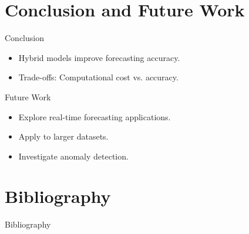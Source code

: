 \documentclass[10pt]{beamer}
\begin{document}
\section{Conclusion and Future Work}
\begin{frame}{Conclusion}
    \begin{itemize}
        \item Hybrid models improve forecasting accuracy.
        \item Trade-offs: Computational cost vs. accuracy.
    \end{itemize}
\end{frame}

\begin{frame}{Future Work}
    \begin{itemize}
        \item Explore real-time forecasting applications.
        \item Apply to larger datasets.
        \item Investigate anomaly detection.
    \end{itemize}
\end{frame}

\section{Bibliography}
\begin{frame}{Bibliography}
    
    
\end{frame}
\end{document}
